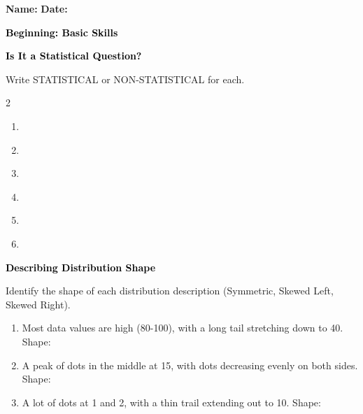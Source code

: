 \documentclass[12pt, letterpaper, fleqn]{article}
\newcommand{\blank}{\underline{\hspace{2.2cm}}}
\begin{document}
\textbf{Name:} \underline{\hspace{5cm}}
\hfill
\textbf{Date:} \underline{\hspace{3cm}}\\

\begin{tcolorbox}[colback=customteal!20]
    \large\textcolor{black}{\textbf{Beginning: Basic Skills}}
\end{tcolorbox}

\vspace{3mm}

\begin{tcolorbox}[colback=customteal!20]
\large\textcolor{black}{\textbf{Is It a Statistical Question?}}
\end{tcolorbox}

\noindent
Write STATISTICAL or NON-STATISTICAL for each.

\vspace{3mm}
\begin{multicols}{2}
\begin{enumerate}[itemsep=1cm, leftmargin=0.6cm]
\item {} \rightarrow \blank
\item {} \rightarrow \blank
\item {} \rightarrow \blank
\item {} \rightarrow \blank
\item {} \rightarrow \blank
\item {} \rightarrow \blank
\end{enumerate}
\end{multicols}
\newpage

\begin{tcolorbox}[colback=customteal!20]
\large\textcolor{black}{\textbf{Describing Distribution Shape}}
\end{tcolorbox}

\noindent
Identify the shape of each distribution description (Symmetric, Skewed Left, Skewed Right).

\vspace{3mm}
\begin{enumerate}[itemsep=1cm, leftmargin=0.6cm]
\item Most data values are high (80-100), with a long tail stretching down to 40. Shape: \blank
\item A peak of dots in the middle at 15, with dots decreasing evenly on both sides. Shape: \blank
\item A lot of dots at 1 and 2, with a thin trail extending out to 10. Shape: \blank
\end{enumerate}
\newpage
\end{document}
